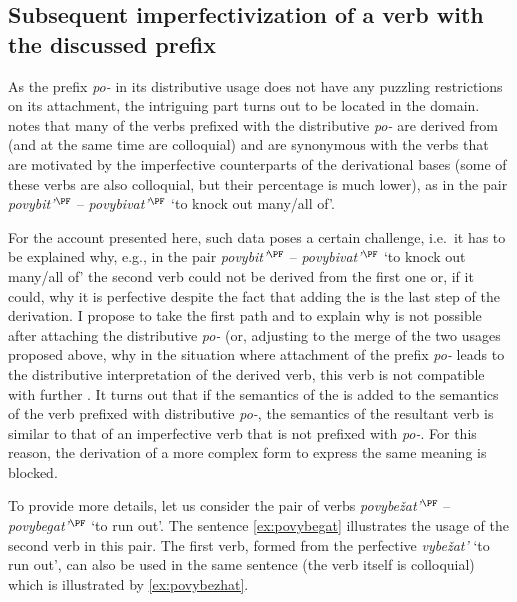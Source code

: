 \subsection{Subsequent imperfectivization of a verb with the discussed prefix}
As the prefix \textit{po-} in its distributive usage does not have any puzzling restrictions on its attachment, the intriguing part turns out to be located in the  domain. \citet[365]{Shvedova:82} notes that many of the verbs prefixed with the distributive \textit{po-} are derived from  (and at the same time are colloquial) and are synonymous with the verbs that are motivated by the imperfective counterparts of the derivational bases (some of these verbs are also colloquial, but their percentage is much lower), as in the pair \textit{povybit'}$^{\PF}$ -- \textit{povybivat'}$^{\PF}$ `to knock out many/all of'.

For the account presented here, such data poses a certain challenge, i.e.\ it has to be explained why, e.g., in the pair \textit{povybit'}$^{\PF}$ -- \textit{povybivat'}$^{\PF}$ `to knock out many/all of' the second verb could not be derived from the first one or, if it could, why it is perfective despite the fact that adding the  is the last step of the derivation. I propose to take the first path and to explain why  is not possible after attaching the distributive \textit{po-} (or, adjusting to the merge of the two usages proposed above, why in the situation where attachment of the prefix \textit{po-} leads to the distributive interpretation of the derived verb, this verb is not compatible with further . It turns out that if the semantics of the  is added to the semantics of the verb prefixed with distributive \textit{po-}, the semantics of the resultant verb is similar to that of an imperfective verb that is not prefixed with \textit{po-}. For this reason, the derivation of a more complex form to express the same meaning is blocked.

To provide more details, let us consider the pair of verbs \textit{povybe\v{z}at'}$^{\PF}$ -- \textit{po\-vy\-be\-gat'}$^{\PF}$ `to run out'. The sentence \ref{ex:povybegat} illustrates the usage of the second verb in this pair. The first verb, formed from the perfective  \textit{vybe\v{z}at'} `to run out', can also be used in the same sentence (the verb itself is colloquial) which is illustrated by \ref{ex:povybezhat}.

